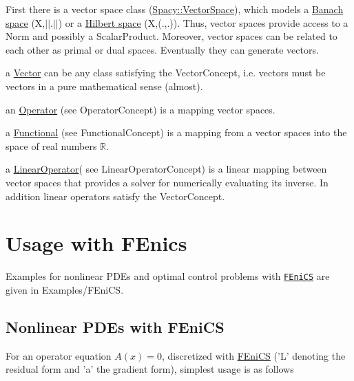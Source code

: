 \begin{DoxyItemize}
\item First there is a vector space class (\hyperlink{classSpacy_1_1VectorSpace}{Spacy\-::\-Vector\-Space}), which models a \hyperlink{namespaceSpacy_a0b66c8f2345b693504180dc7fb187958}{Banach space}  (X,$\vert$$\vert$.$\vert$$\vert$) or a \hyperlink{namespaceSpacy_a927756dd42df3e79c302df1f8f635b65}{Hilbert space}  (X,(.,.)). Thus, vector spaces provide access to a Norm and possibly a Scalar\-Product. Moreover, vector spaces can be related to each other as primal or dual spaces. Eventually they can generate vectors.
\item a \hyperlink{classSpacy_1_1Vector}{Vector} can be any class satisfying the Vector\-Concept, i.\-e. vectors must be vectors in a pure mathematical sense (almost).
\item an \hyperlink{classSpacy_1_1Operator}{Operator} (see Operator\-Concept) is a mapping vector spaces.
\item a \hyperlink{classSpacy_1_1Functional}{Functional} (see Functional\-Concept) is a mapping from a vector spaces into the space of real numbers $ \mathbb{R} $.
\item a \hyperlink{classSpacy_1_1LinearOperator}{Linear\-Operator}( see Linear\-Operator\-Concept) is a linear mapping between vector spaces that provides a solver for numerically evaluating its inverse. In addition linear operators satisfy the Vector\-Concept.
\end{DoxyItemize}\hypertarget{index_sec_usage_fenics}{}\section{Usage with F\-Enics}\label{index_sec_usage_fenics}
Examples for nonlinear P\-D\-Es and optimal control problems with \href{http://www.fenicsproject.org}{\tt F\-Eni\-C\-S} are given in Examples/\-F\-Eni\-C\-S.\hypertarget{index_sub_usage_fenics_pde}{}\subsection{Nonlinear P\-D\-Es with F\-Eni\-C\-S}\label{index_sub_usage_fenics_pde}
For an operator equation $A(x)=0$, discretized with \hyperlink{namespaceSpacy_1_1FEniCS}{F\-Eni\-C\-S} ('L' denoting the residual form and 'a' the gradient form), simplest usage is as follows 
